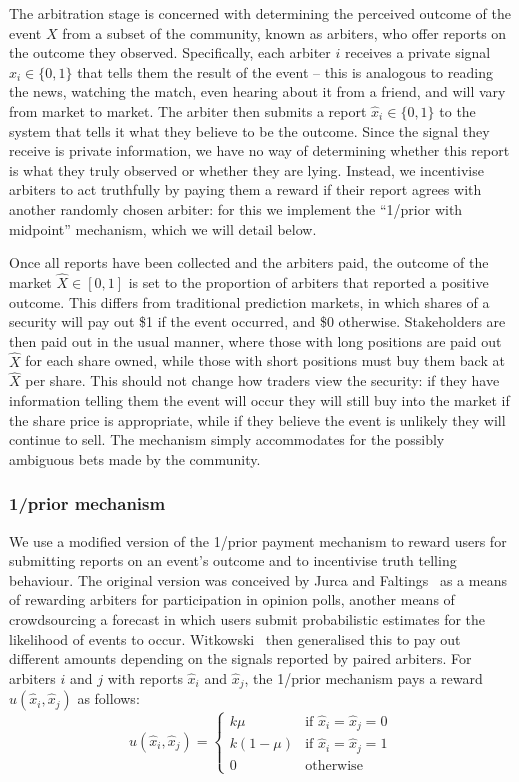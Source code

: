 The arbitration stage is concerned with determining the perceived outcome of
the event $X$ from a subset of the community, known as arbiters, who offer
reports on the outcome they observed. Specifically, each arbiter $i$ receives a
private signal $x_i \in \{0,1\}$ that tells them the result of the event --
this is analogous to reading the news, watching the match, even hearing about
it from a friend, and will vary from market to market. The arbiter then submits
a report $\hat{x}_i \in \{0,1\}$ to the system that tells it what they believe
to be the outcome. Since the signal they receive is private information, we
have no way of determining whether this report is what they truly observed or
whether they are lying. Instead, we incentivise arbiters to act truthfully by
paying them a reward if their report agrees with another randomly chosen
arbiter: for this we implement the ``1/prior with midpoint'' mechanism, which
we will detail below.

Once all reports have been collected and the arbiters paid, the outcome of the
market $\hat{X} \in [0,1]$ is set to the proportion of arbiters that reported a
positive outcome. This differs from traditional prediction markets, in which
shares of a security will pay out \$1 if the event occurred, and \$0 otherwise.
Stakeholders are then paid out in the usual manner, where those with long
positions are paid out $\hat{X}$ for each share owned, while those with short
positions must buy them back at $\hat{X}$ per share. This should not change how
traders view the security: if they have information telling them the event will
occur they will still buy into the market if the share price is appropriate,
while if they believe the event is unlikely they will continue to sell. The
mechanism simply accommodates for the possibly ambiguous bets made by the
community.

\subsubsection{1/prior mechanism}

We use a modified version of the 1/prior payment mechanism to reward users for
submitting reports on an event's outcome and to incentivise truth telling
behaviour. The original version was conceived by Jurca and
Faltings~\cite{JurcaFaltings2008, JurcaFaltings2011} as a means of rewarding
arbiters for participation in opinion polls, another means of crowdsourcing a
forecast in which users submit probabilistic estimates for the likelihood of
events to occur. Witkowski~\cite{Witkowski2014} then generalised this to pay
out different amounts depending on the signals reported by paired arbiters. For
arbiters $i$ and $j$ with reports $\hat{x}_i$ and $\hat{x}_j$, the 1/prior
mechanism pays a reward $u(\hat{x}_i, \hat{x}_j)$ as follows:
%
\begin{equation}
	\label{eq:oneOverPrior}
	u(\hat{x}_i, \hat{x}_j) =
	\begin{cases}
		k \mu & \text{if } \hat{x}_i = \hat{x}_j = 0 \\
		k (1-\mu) & \text{if } \hat{x}_i = \hat{x}_j = 1 \\
		0 & \text{otherwise}
	\end{cases}
\end{equation}

